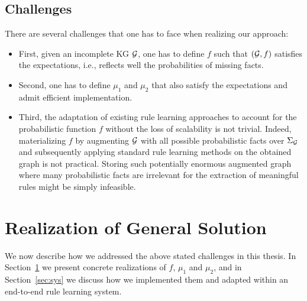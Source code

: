 \subsection{Challenges} 
There are several challenges that one has to face when realizing our approach:
\begin{itemize}
\item First, given an incomplete KG $\mathcal{G}$, one has to define $f$
such that $(\mathcal{G},f)$ satisfies the expectations, i.e., reflects well the probabilities of missing facts.
\item Second, one has to define $\mu_1$ and $\mu_2$ that also satisfy the expectations and admit efficient implementation.
\item Third, the adaptation of existing rule learning approaches to account for the probabilistic function $f$ without the loss of scalability is not trivial. 
Indeed, materializing $f$ by augmenting $\mathcal{G}$ with all possible probabilistic facts over $\Sigma_{\mathcal{G}}$ and subsequently applying standard rule learning methods on the obtained graph is not practical. Storing such potentially enormous augmented graph 
where many probabilistic facts are irrelevant for the extraction of meaningful rules might be simply infeasible.
\end{itemize}
\section{Realization of General Solution}
\label{section: realisation}
We now %
describe how we addressed the above stated challenges in this thesis.
In Section~\ref{section: realisation} we present concrete realizations of $f$, $\mu_1$ and $\mu_2$, and in Section~\ref{sec:sys} we discuss how we implemented them and adapted within an %
end-to-end rule learning system.


